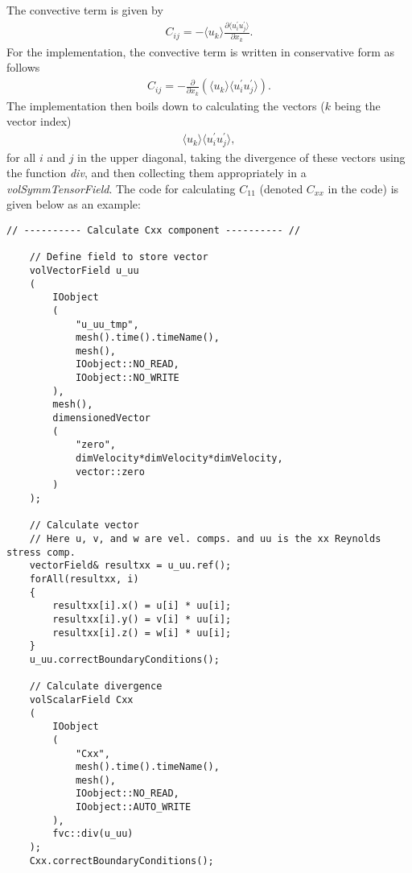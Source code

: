 The convective term is given by
\begin{align}
    C_{ij} = -\langle u_k \rangle \frac{\partial \langle u^{\prime}_i u^{\prime}_j \rangle}{\partial x_k} .
\end{align}
For the implementation, the convective term is written in conservative form as follows
\begin{align}
    C_{ij} 
    =
    - \frac{\partial}{\partial x_k} \left( \langle u_k \rangle \langle u^{\prime}_i u^{\prime}_j \rangle \right) .
\end{align}
The implementation then boils down to calculating the vectors ($k$ being the vector index)
\begin{align}
    \langle u_k \rangle \langle u^{\prime}_i u^{\prime}_j \rangle ,
\end{align}
for all $i$ and $j$ in the upper diagonal, taking the divergence of these vectors using the function \emph{div}, and then collecting them appropriately in a \emph{volSymmTensorField}.
The \OF code for calculating $C_{11}$ (denoted $C_{xx}$ in the code) is given below as an example:

\begin{lstlisting}[emph={ddt,div,laplacian}]
    // ---------- Calculate Cxx component ---------- //     

    // Define field to store vector
    volVectorField u_uu
    (
        IOobject
        (
            "u_uu_tmp", 
            mesh().time().timeName(), 
            mesh(), 
            IOobject::NO_READ, 
            IOobject::NO_WRITE
        ),
        mesh(), 
        dimensionedVector
        (
            "zero", 
            dimVelocity*dimVelocity*dimVelocity,
            vector::zero
        )
    );
    
    // Calculate vector 
    // Here u, v, and w are vel. comps. and uu is the xx Reynolds stress comp.
    vectorField& resultxx = u_uu.ref();
    forAll(resultxx, i)
    {
        resultxx[i].x() = u[i] * uu[i];
        resultxx[i].y() = v[i] * uu[i];
        resultxx[i].z() = w[i] * uu[i];
    }
    u_uu.correctBoundaryConditions();
    
    // Calculate divergence                                                
    volScalarField Cxx
    (
        IOobject
        (
            "Cxx", 
            mesh().time().timeName(), 
            mesh(), 
            IOobject::NO_READ, 
            IOobject::AUTO_WRITE
        ),
        fvc::div(u_uu)
    );
    Cxx.correctBoundaryConditions();
\end{lstlisting}

